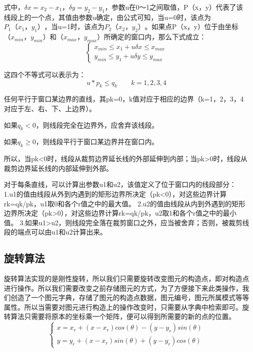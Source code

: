 \documentclass[a4paper,UTF8]{article}
\theoremstyle{definition}
\begin{document}
\label{s2}
\par 式中，$\delta x=x_{2}-x_{1}$，$\delta y=y_{2}-y_{1}$，参数u在0～1之间取值，P（x，y）代表了该线段上的一个点，其值由参数u确定，由公式可知，当u=0时，该点为$P_{1}（x_{1}，y_{1}）$，当u=1时，该点为$P_{2}（x_{2}，y_{2}）$。如果点P（x，y）位于由坐标$（x_{min}，y_{min}）和（x_{max}，y_{max}）$所确定的窗口内，那么下式成立：
\begin{equation}
\left\{
\begin{aligned}
x_{min}\leq x_{1}+u\delta x\leq x_{max}\\
y_{min}\leq y_{1}+u\delta y\leq y_{max}
\end{aligned}
\right.
\end{equation}
\par 这四个不等式可以表示为：
\begin{equation}
u*p_{k}\leq q_{k}\qquad k=1,2,3,4
\end{equation}
\par 任何平行于窗口某边界的直线，其pk=0，k值对应于相应的边界（k=1，2，3，4对应于左、右、下、上边界）。
\par 如果$q_{k}<0$，则线段完全在边界外，应舍弃该线段。
\par 如果$q_{k}\geq 0$，则线段平行于窗口某边界并在窗口内。
\par 所以，当pk<0时，线段从裁剪边界延长线的外部延伸到内部；当pk>0时，线段从裁剪边界延长线的内部延伸到外部。
\par 对于每条直线，可以计算出参数u1和u2，该值定义了位于窗口内的线段部分：\\
1.u1的值由线段从外到内遇到的矩形边界所决定（pk<0），对这些边界计算rk=qk/pk，u1取0和各个r值之中的最大值。
2.u2的值由线段从内到外遇到的矩形边界所决定（pk>0），对这些边界计算rk=qk/pk，u2取1和各个r值之中的最小值。
3.如果u1>u2，则线段完全落在裁剪窗口之外，应当被舍弃；否则，被裁剪线段的端点可以由u1和u2计算出来。
\par 

\subsection{旋转算法}
旋转算法实现的是刚性旋转，所以我们只需要旋转改变图元的构造点，即对构造点进行操作。所以我们需要改变之前存储图元的方式，为了方便接下来此类操作，我们创造了一个图元字典，存储了图元的构造点数据，图元编号，图元所属模式等等属性。所以当需要对图元进行构造上的操作改变时，只需要从字典中检索即可。旋转算法只需要将原本的坐标乘一个矩阵，便可以得到所需要的新的点的位置。
\begin{equation}
\left\{
\begin{aligned}
x=x_{r}+(x-x_{r})cos(\theta)-(y-y_{r})sin(\theta)\\
y=y_{r}+(x-x_{r})sin(\theta)+(y-y_{r})cos(\theta)
\end{aligned}
\right.
\end{equation}
\end{document}
